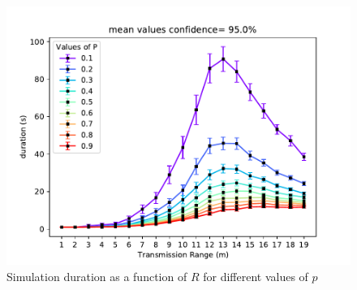 \begin{figure}[H]
    \begin{center}
        \includegraphics[scale=.7,trim={0 0 0 0.8cm},clip]{img/big_duration (s)_r_mean_95.0.pdf}
    \end{center}
    \vspace*{-0.5cm}
    \caption{Simulation duration as a function of $R$ for different values of $p$}
    \label{fig:durationRP}
\end{figure}
\noindent

